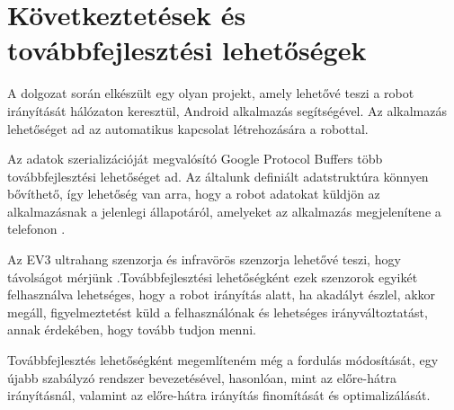 \chapter{Következtetések és továbbfejlesztési lehetőségek}
A dolgozat során elkészült egy olyan projekt, amely lehetővé teszi a robot irányítását hálózaton keresztül, Android alkalmazás segítségével. Az alkalmazás lehetőséget ad az automatikus kapcsolat létrehozására a robottal.

Az adatok szerializációját megvalósító Google Protocol Buffers több továbbfejlesztési lehetőséget ad. Az általunk definiált adatstruktúra könnyen bővíthető, így lehetőség van arra, hogy a robot adatokat küldjön az alkalmazásnak a jelenlegi állapotáról, amelyeket az alkalmazás megjelenítene a telefonon . 

Az EV3 ultrahang szenzorja és infravörös szenzorja lehetővé teszi, hogy távolságot mérjünk .Továbbfejlesztési lehetőségként ezek szenzorok egyikét felhasználva lehetséges, hogy a robot irányítás alatt, ha akadályt észlel, akkor megáll, figyelmeztetést küld a felhasználónak és lehetséges irányváltoztatást, annak érdekében, hogy tovább tudjon menni.

Továbbfejlesztés lehetőségként megemlíteném még a fordulás módosítását, egy újabb szabályzó rendszer bevezetésével, hasonlóan, mint az előre-hátra irányításnál, valamint az előre-hátra irányítás finomítását és optimalizálását.



